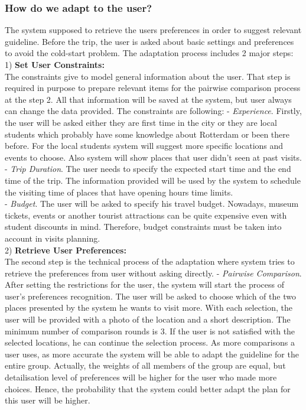\documentclass[11pt,a4paper,oneside]{article}
\begin{document}
\subsubsection{How do we adapt to the user?}
The system supposed to retrieve the users preferences in order to suggest relevant guideline. Before the trip, the user is asked about basic settings and preferences to avoid the cold-start problem. The adaptation process includes 2 major steps: \\	1) \textbf{Set User Constraints:}\\	
The constraints give to model general information about the user. That step is required in purpose to prepare relevant items for the pairwise comparison process at the step 2. All that information will be saved at the system, but user always can change the data provided. The constraints are following:\newline 
	- \textit{Experience}. Firstly, the user will be asked either they are first time in the city or they are local students which probably have some knowledge about Rotterdam or been there before. For the local students system will suggest more specific locations and events to choose. Also system will show places that user didn’t seen at past visits. \\
    - \textit{Trip Duration}. The user needs to specify the expected start time and the end time of the trip. The information provided will be used by the system to schedule the visiting time of places that have opening hours time limits.\\
    - \textit{Budget}. The user will be asked to specify his travel budget. Nowadays, museum tickets, events or another tourist attractions can be quite expensive even with student discounts in mind. Therefore, budget constraints must be taken into account in visits planning.\\
  2) \textbf{Retrieve User Preferences:}\\
  The second step is the technical process of the adaptation where system tries to retrieve the preferences from user without asking directly.\newline  
- \textit{Pairwise Comparison}. After setting the restrictions for the user, the system will start the process of user's preferences recognition. The user will be asked to choose which of the two places presented by the system he wants to visit more. With each selection, the user will be provided with a photo of the location and a short description. The minimum number of comparison rounds is 3. If the user is not satisfied with the selected locations, he can continue the selection process. As more comparisons a user uses, as more accurate the system will be able to adapt the guideline for the entire group. Actually, the weights of all members of the group are equal, but detailisation level of preferences will be higher for the user who made more choices. Hence, the probability that the system could better adapt the plan for this user will be higher.
\end{document}
